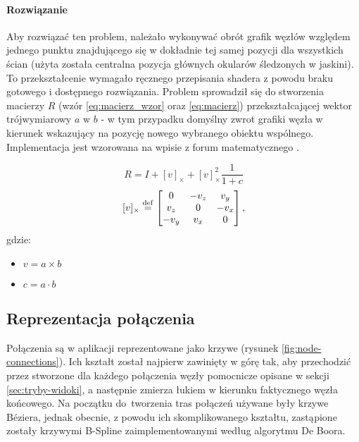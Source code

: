 
\paragraph{Rozwiązanie} Aby rozwiązać ten problem, należało wykonywać obrót grafik węzłów względem jednego punktu znajdującego się w dokładnie tej samej pozycji dla wszystkich ścian (użyta została centralna pozycja głównych okularów śledzonych w jaskini). To przekształcenie wymagało ręcznego przepisania shadera z powodu braku gotowego i dostępnego rozwiązania. Problem sprowadził się do stworzenia macierzy \(R\) (wzór \ref{eq:macierz_wzor} oraz \ref{eq:macierz}) przekształcającej wektor trójwymiarowy \(a\) w \(b\) - w tym przypadku domyślny zwrot grafiki węzła w kierunek wskazujący na pozycję nowego wybranego obiektu wspólnego. Implementacja jest wzorowana na wpisie z forum matematycznego \cite{BillboardShaderFormula}.

\newcommand\dotProd{a \cdot b}
\newcommand\crossProd[1]{(\overrightarrow{a \times b})_#1}
\begin{equation}
	\label{eq:macierz_wzor}
	R = I + [v]_{\times} + [v]_{\times}^2\frac{1}{1 + c}
\end{equation}
\begin{equation}
	\label{eq:macierz}
	[v]_{\times} \stackrel{\rm def}{=} 
	\begin{bmatrix}
		0 & -v_z & v_y\\
		v_z & 0 & -v_x\\
		-v_y & v_x & 0
	\end{bmatrix},
\end{equation}
gdzie:
\begin{itemize}
	\item \(v = a \times b\)
	\item \(c = a \cdot b\)
\end{itemize}

\subsection{Reprezentacja połączenia}
Połączenia są w aplikacji reprezentowane jako krzywe (rysunek \ref{fig:node-connections}). Ich kształt został najpierw zawinięty w górę tak, aby przechodzić przez stworzone dla każdego połączenia węzły pomocnicze opisane w sekcji \ref{sec:tryby-widoki}, a następnie zmierza łukiem w kierunku faktycznego węzła końcowego. Na początku do~tworzenia tras połączeń używane były krzywe Béziera, jednak obecnie, z powodu ich skomplikowanego kształtu, zastąpione zostały krzywymi B-Spline zaimplementowanymi według algorytmu De Boora.

